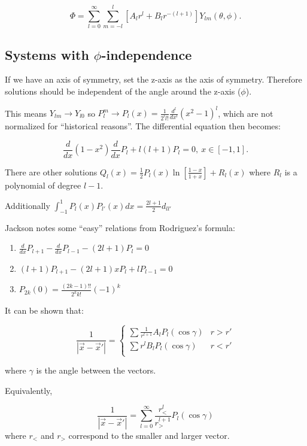 \documentclass[a4paper,twoside,master.tex]{subfiles}
\begin{document}
\begin{equation}
    \Phi = \sum_{l=0}^\infty \sum_{m=-l}^l [A_l r^l + B_l r^{-(l+1)}]Y_{lm}(\theta,\phi).
\end{equation}

\subsection{Systems with $\phi$-independence}%
\label{sub:systems_with_phi_independence}

If we have an axis of symmetry, set the z-axis as the axis of symmetry. Therefore solutions should be independent of the angle around the z-axis ($\phi$).

This means $Y_{lm}\to Y_{l0}$ so $P_l^m\to P_l(x) = \frac{1}{2^l l!}\frac{d^l}{dx^l}(x^2-1)^l$, which are not normalized for ``historical reasons''. The differential equation then becomes:

\begin{equation}
    \frac{d}{dx}(1-x^2)\frac{d}{dx}P_l + l(l+1)P_l = 0,\ x\in[-1,1].
\end{equation}

\begin{remark}
There are other solutions
$Q_l(x)=\frac{1}{2}P_l(x)\ln\left[\frac{1-x}{1+x}\right]+R_l(x)$ where $R_l$ is a polynomial of degree $l-1$.
\end{remark}

Additionally $\int_{-1}^1 P_l(x)P_{l'}(x)dx = \frac{2l+1}{2}d_{ll'}$

Jackson notes some ``easy'' relations from Rodriguez's formula:

\begin{enumerate}
\item $\frac{d}{dx}P_{l+1}-\frac{d}{dx}P_{l-1}-(2l+1)P_l = 0$
\item $(l+1)P_{l+1} - (2l+1)xP_l + lP_{l-1} = 0$
\item $P_{2k}(0) = \frac{(2k-1)!!}{2^k k!}(-1)^k$
\end{enumerate}

It can be shown that:

\begin{equation}
    \frac{1}{|\vec{x}-\vec{x}'|} = \begin{cases}\sum \frac{1}{r^{l+1}} A_l P_l(\cos\gamma)& r>r'\\\sum r^l B_l P_l(\cos\gamma)& r<r'\\\end{cases}
\end{equation}

where $\gamma$ is the angle between the vectors.

Equivalently,

\begin{equation}
    \frac{1}{|\vec{x}-\vec{x}'|} = \sum_{l=0}^\infty \frac{r_<^l}{r_>^{l+1}}P_l(\cos\gamma)
\end{equation}
where $r_<$ and $r_>$ correspond to the smaller and larger vector.
\end{document}
